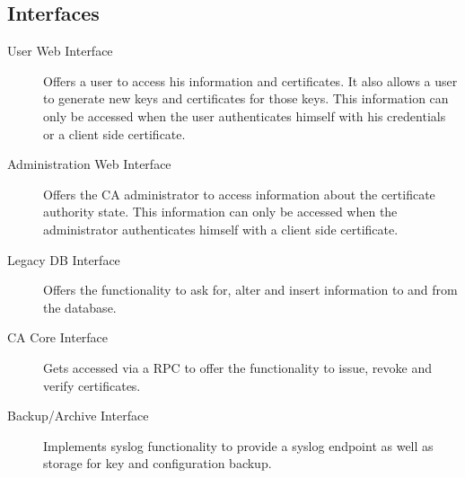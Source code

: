 \documentclass[a4paper, toc=index, 12pt, DIV14, twoside, BCOR2cm, headsepline, numbers=noenddot, bibliography=totoc]{scrbook}
\begin{document}
\subsection{Interfaces}
\begin{description}
\item[User Web Interface ]
Offers a user to access his information and certificates. It also allows a user to generate new keys and certificates for those keys. This information can only be accessed when the user authenticates himself with his credentials or a client side certificate.

\item[Administration Web Interface ]
Offers the CA administrator to access information about the certificate authority state. This information can only be accessed when the administrator authenticates himself with a client side certificate.

\item[Legacy DB Interface ]
Offers the functionality to ask for, alter and insert information to and from the database.

\item[CA Core Interface ]
Gets accessed via a RPC to offer the functionality to issue, revoke and verify certificates.

\item[Backup/Archive Interface ]
Implements syslog functionality to provide a syslog endpoint as well as storage for key and configuration backup.
\end{description}
\end{document}
